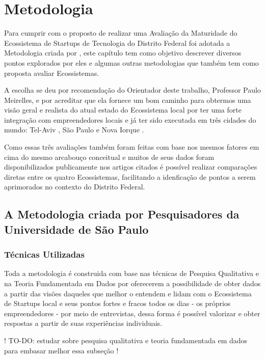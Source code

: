 \chapter[Metodologia]{Metodologia}
\label{cap-metodologia}

Para cumprir com o proposto de realizar uma Avaliação da Maturidade do Ecossistema de Startups de Tecnologia do Distrito Federal foi adotada a Metodologia criada por \cite{kon2015}, este capítulo tem como objetivo descrever diversos pontos explorados por eles e algumas outras metodologias que também tem como proposta avaliar Ecossistemas.

A escolha se deu por recomendação do Orientador deste trabalho, Professor Paulo Meirelles, e por acreditar que ela fornece um bom caminho para obtermos uma visão geral e realista do atual estado do Ecossistema local por ter uma forte integração com empreendedores locais e já ter sido executada em três cidades do mundo: Tel-Aviv \cite{kon2014}, São Paulo \cite{monna2015} e Nova Iorque \cite{cukier2016}. 

Como essas três avaliações também foram feitas com base nos mesmos fatores em cima do mesmo arcabouço conceitual e muitos de seus dados foram disponibilizados publicamente nos artigos citados é possível realizar comparações diretas entre os quatro Ecossistemas, facilitando a idenficação de pontos a serem aprimorados no contexto do Distrito Federal.

\section{A Metodologia criada por Pesquisadores da Universidade de São Paulo}
\label{section:metodologia_de_avaliacao_adotada}

\subsection{Técnicas Utilizadas}
\label{subsection:tecnicas_utilizadas}

Toda a metodologia é construida com base nas técnicas de Pesquisa Qualitativa e na Teoria Fundamentada em Dados por oferecerem a possibilidade de obter dados a partir das visões daqueles que melhor o entendem e lidam com o Ecossistema de Startups local e seus pontos fortes e fracos todos os dias - os próprios empreendedores - por meio de entrevistas, dessa forma é possível valorizar e obter respostas a partir de suas experiências individuais.

! TO-DO: estudar sobre pesquisa qualitativa e teoria fundamentada em dados para embasar melhor essa subseção !


